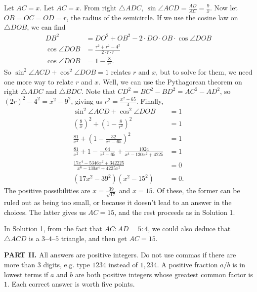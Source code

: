 \documentclass[11pt,paper=letter]{scrartcl}
\newenvironment{rem}%
{\noindent \ignorespaces \small \sffamily \sansmath {\bfseries Remark.}}%
{\ignorespacesafterend}
\begin{document}
\begin{enumerate}[align=left,leftmargin=*]
Let $AC = x$. Let $AC = x$. From right $\triangle ADC$, $\sin \angle ACD = \frac{AD}{AC} = \frac{9}{x}$. Now let $OB = OC = OD = r$, the radius of the semicircle. If we use the cosine law on $\triangle DOB$, we can find
\begin{align*}
DB^2 &= DO^2 + OB^2 - 2 \cdot DO \cdot OB \cdot \cos \angle DOB \\
\cos \angle DOB &= \frac{r^2 + r^2 - 4^2}{2 \cdot r \cdot r} \\
\cos \angle DOB &= 1 - \frac{8}{r^2}.
\end{align*}
So $\sin^2 \angle ACD + \cos^2 \angle DOB = 1$ relates $r$ and $x$, but to solve for them, we need one more way to relate $r$ and $x$. Well, we can use the Pythagorean theorem on right $\triangle ADC$ and $\triangle BDC$. Note that $CD^2 = BC^2 - BD^2 = AC^2 - AD^2$, so $(2r)^2 - 4^2 = x^2 - 9^2$, giving us $r^2 = \frac{x^2 - 65}{4}$. Finally,
\begin{align*}
\sin^2 \angle ACD + \cos^2 \angle DOB &= 1 \\
\left(\frac{9}{x}\right)^2
+ \left(1 - \frac{8}{r^2}\right)^2
&= 1 \\
\frac{81}{x^2}
+ \left(1 - \frac{32}{x^2 - 65}\right)^2 &= 1 \\
\frac{81}{x^2} +
1 - \frac{64}{x^2 - 65} + \frac{1024}{x^4 - 130x^2 + 4225}
&= 1 \\
\frac{17x^4 - 5346x^2 + 342225}{x^6 - 130x^4 + 4225x^2} &= 0 \\
\left(17x^2 - 39^2\right)\left(x^2 - 15^2\right) &= 0.
\end{align*}
The positive possibilities are $x = \frac{39}{\sqrt{17}}$ and $x = 15$. Of these, the former can be ruled out as being too small, or because it doesn't lead to an answer in the choices. The latter gives us $AC = 15$, and the rest proceeds as in Solution 1.

\begin{rem}
In Solution 1, from the fact that $AC : AD = 5 : 4$, we could also deduce that $\triangle ACD$ is a $3$--$4$--$5$ triangle, and then get $AC = 15$.
\end{rem}

\end{enumerate}

\noindent\textbf{PART II.} All answers are positive integers. Do not use commas if there are more than $3$ digits, e.g. type $1234$ instead of $1,234$. A positive fraction $a/b$ is in lowest terms if $a$ and $b$ are both positive integers whose greatest common factor is $1$. Each correct answer is worth five points.
\end{document}
